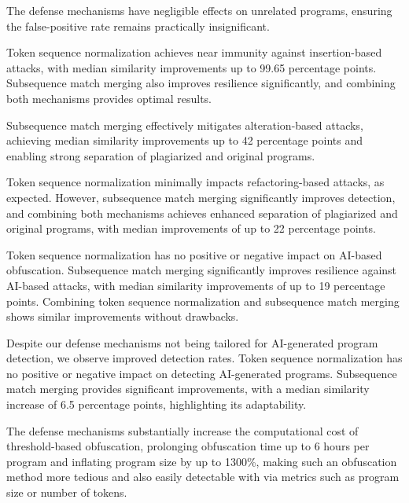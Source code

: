 \begin{description}[style=unboxed, leftmargin=0cm]
    \item[Effect on False Positives (\autoref{sec:eval-unrel}):] The defense mechanisms have negligible effects on unrelated programs, ensuring the false-positive rate remains practically insignificant.
    
    \item[Insertion-based Obfuscation (\autoref{sec:eval-insert}):] Token sequence normalization achieves near immunity against insertion-based attacks, with median similarity improvements up to 99.65 percentage points. Subsequence match merging also improves resilience significantly, and combining both mechanisms provides optimal results.
    
    \item[Alteration-based Obfuscation (\autoref{sec:eval-alter}):] Subsequence match merging effectively mitigates alteration-based attacks, achieving median similarity improvements up to 42 percentage points and enabling strong separation of plagiarized and original programs.
    
    \item[Refactoring-based Obfuscation (\autoref{sec:eval-refactor}):] Token sequence normalization minimally impacts refactoring-based attacks, as expected. However, subsequence match merging significantly improves detection, and combining both mechanisms achieves enhanced separation of plagiarized and original programs, with median improvements of up to 22 percentage points.
    
    \item[GPT-4-based Obfuscation (\autoref{sec:eval-gptobf}):] Token sequence normalization has no positive or negative impact on AI-based obfuscation. Subsequence match merging significantly improves resilience against AI-based attacks, with median similarity improvements of up to 19 percentage points. Combining token sequence normalization and subsequence match merging shows similar improvements without drawbacks.
    
    \item[GPT-4-generated Programs (\autoref{sec:eval-gptgen}):] Despite our defense mechanisms not being tailored for AI-generated program detection, we observe improved detection rates. Token sequence normalization has no positive or negative impact on detecting AI-generated programs. Subsequence match merging provides significant improvements, with a median similarity increase of 6.5 percentage points, highlighting its adaptability.
    
    \item[Threshold-based Plagiarism (\autoref{sec:eval-mossad}):] The defense mechanisms substantially increase the computational cost of threshold-based obfuscation, prolonging obfuscation time up to 6 hours per program and inflating program size by up to 1300\%, making such an obfuscation method more tedious and also easily detectable with via metrics such as program size or number of tokens.
\end{description}


